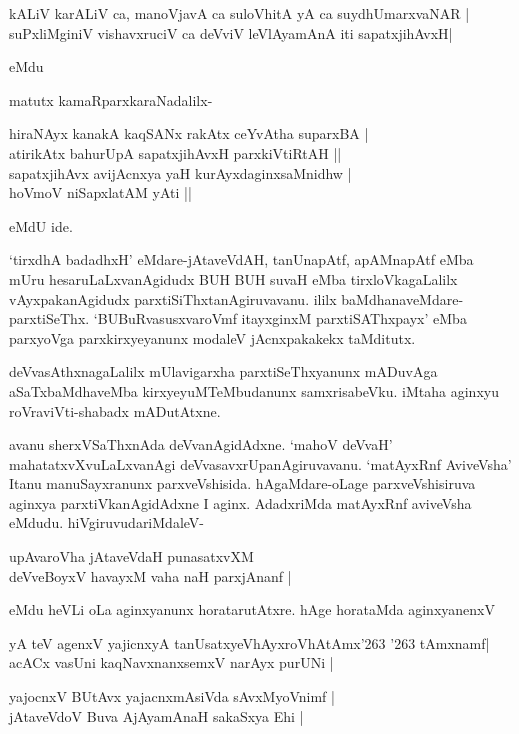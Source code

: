 \begin{shloka}
kALiV karALiV ca, manoVjavA ca suloVhitA yA ca suydhUmarxvaNAR |\\\label{116}
suPxliMginiV vishavxruciV ca deVviV leVlAyamAnA iti sapatxjihAvxH| \\
\end{shloka}
 eMdu

\noindent
matutx kamaRparxkaraNadalilx-

\begin{shloka}
hiraNAyx kanakA kaqSANx rakAtx ceYvAtha suparxBA |\\\label{116a}
atirikAtx bahurUpA sapatxjihAvxH parxkiVtiRtAH ||\\
sapatxjihAvx avijAcnxya yaH kurAyxdaginxsaMnidhw |\\
hoVmoV niSapxlatAM yAti ||
\end{shloka}
eMdU ide.

`tirxdhA badadhxH' eMdare-jAtaveVdAH, tanUnapAtf, apAMnapAtf eMba mUru 
hesaruLaLxvanAgidudx BUH BUH suvaH eMba tirxloVkagaLalilx vAyxpakanAgidudx parxtiSiThxtanAgiruvavanu. ililx baMdhanaveMdare-parxtiSeThx. `BUBuRvasusxvaroVmf\label{116b} itayxginxM parxtiSAThxpayx' eMba parxyoVga parxkirxyeyanunx modaleV jAcnxpakakekx taMditutx. 

deVvasAthxnagaLalilx mUlavigarxha parxtiSeThxyanunx mADuvAga aSaTxbaMdhaveMba kirxyeyuMTeMbudanunx samxrisabeVku. iMtaha aginxyu roVraviVti-shabadx mADutAtxne.

avanu sherxVSaThxnAda deVvanAgidAdxne. `mahoV deVvaH' 
mahatatxvXvuLaLxvanAgi deVvasavxrUpanAgiruvavanu. `matAyxRnf AviveVsha' Itanu manuSayxranunx parxveVshisida. hAgaMdare-oLage parxveVshisiruva aginxya parxtiVkanAgidAdxne  I aginx. AdadxriMda matAyxRnf aviveVsha eMdudu. hiVgiruvudariMdaleV-

\begin{shloka}
upAvaroVha jAtaveVdaH punasatxvXM\\\label{116c}
deVveBoyxV havayxM vaha naH parxjAnanf |
\end{shloka}

\noindent
eMdu heVLi oLa aginxyanunx horatarutAtxre. hAge horataMda aginxyanenxV 

\begin{shloka}
yA teV agenxV yajicnxyA tanUsatxyeVhAyxroVhAtAmx\char'263 \char'263 tAmxnamf|\\\label{116d}
acACx vasUni kaqNavxnanxsemxV narAyx purUNi |
\end{shloka}

\begin{shloka}
yajocnxV BUtAvx yajacnxmAsiVda sAvxMyoVnimf |\\
jAtaveVdoV Buva AjAyamAnaH sakaSxya Ehi |
\end{shloka}

